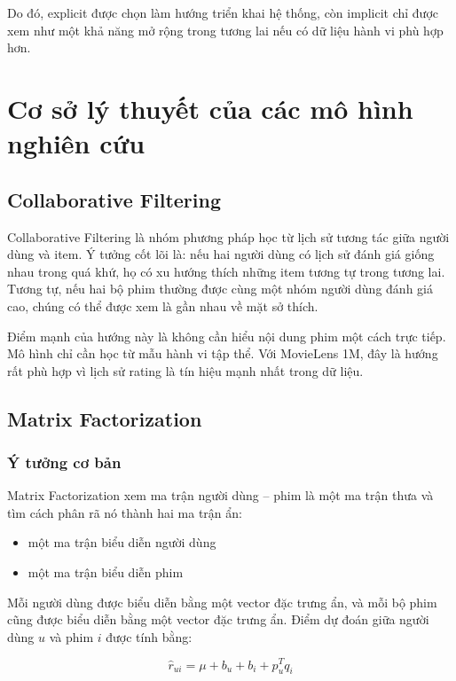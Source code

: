 \documentclass[12pt,a4paper]{article}
\begin{document}
Do đó, explicit được chọn làm hướng triển khai hệ thống, còn implicit chỉ được xem như một khả năng mở rộng trong tương lai nếu có dữ liệu hành vi phù hợp hơn.

\section{Cơ sở lý thuyết của các mô hình nghiên cứu}

\subsection{Collaborative Filtering}

Collaborative Filtering là nhóm phương pháp học từ lịch sử tương tác giữa người dùng và item. Ý tưởng cốt lõi là: nếu hai người dùng có lịch sử đánh giá giống nhau trong quá khứ, họ có xu hướng thích những item tương tự trong tương lai. Tương tự, nếu hai bộ phim thường được cùng một nhóm người dùng đánh giá cao, chúng có thể được xem là gần nhau về mặt sở thích.

Điểm mạnh của hướng này là không cần hiểu nội dung phim một cách trực tiếp. Mô hình chỉ cần học từ mẫu hành vi tập thể. Với MovieLens 1M, đây là hướng rất phù hợp vì lịch sử rating là tín hiệu mạnh nhất trong dữ liệu.

\subsection{Matrix Factorization}

\subsubsection{Ý tưởng cơ bản}

Matrix Factorization xem ma trận người dùng -- phim là một ma trận thưa và tìm cách phân rã nó thành hai ma trận ẩn:

\begin{itemize}[leftmargin=1.5cm]
    \item một ma trận biểu diễn người dùng
    \item một ma trận biểu diễn phim
\end{itemize}

Mỗi người dùng được biểu diễn bằng một vector đặc trưng ẩn, và mỗi bộ phim cũng được biểu diễn bằng một vector đặc trưng ẩn. Điểm dự đoán giữa người dùng \(u\) và phim \(i\) được tính bằng:

\begin{equation}
\hat{r}_{ui} = \mu + b_u + b_i + p_u^T q_i
\end{equation}
\end{document}
